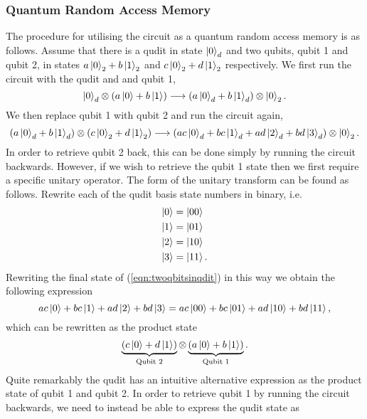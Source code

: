 \subsubsection{Quantum Random Access Memory}
\label{subsubsection:qram}
The procedure for utilising the circuit as a quantum random access memory is as follows.
Assume that there is a qudit in state $\ket{0}_d$ and two qubits, qubit 1 and qubit 2, in states $a\ket{0}_2 + b\ket{1}_2$ and $c\ket{0}_2 + d\ket{1}_2$ respectively.
We first run the circuit with the qudit and and qubit 1,
\begin{equation}
    \ket{0}_d \otimes \left(a\ket{0} + b\ket{1}\right) \longrightarrow \left(a\ket{0}_d + b\ket{1}_d\right) \otimes \ket{0}_2.
\end{equation}
We then replace qubit 1 with qubit 2 and run the circuit again,
\begin{equation}
    \left(a\ket{0}_d + b\ket{1}_d\right) \otimes \left(c\ket{0}_2 + d\ket{1}_2 \right) \longrightarrow \left(ac\ket{0}_d + bc\ket{1}_d + ad\ket{2}_d + bd\ket{3}_d \right)\otimes\ket{0}_2.
    \label{eqn:twoqbitsinqdit}
\end{equation}
In order to retrieve qubit 2 back, this can be done simply by running the circuit backwards.
However, if we wish to retrieve the qubit 1 state then we first require a specific unitary operator. The form of the unitary transform can be found as follows.
Rewrite each of the qudit basis state numbers in binary, i.e.
\begin{align}
    \ket{0} &= \ket{00}\\
    \ket{1} &= \ket{01}\\
    \ket{2} &= \ket{10}\\
    \ket{3} &= \ket{11}.
\end{align}
Rewriting the final state of (\ref{eqn:twoqbitsinqdit}) in this way we obtain the following expression
\begin{equation}
    ac\ket{0} + bc\ket{1} + ad\ket{2} + bd\ket{3} = ac\ket{00} + bc\ket{01} + ad\ket{10} + bd\ket{11},
    \label{eqn:binaryexpression}
\end{equation}
which can be rewritten as the product state
\begin{equation}
    \underbrace{\left(c\ket{0} + d\ket{1}\right)}_{\text{Qubit 2}} \otimes \underbrace{\left(a\ket{0} + b\ket{1}\right)}_{\text{Qubit 1}}.
\end{equation}
Quite remarkably the qudit has an intuitive alternative expression as the product state of qubit 1 and qubit 2. In order to retrieve qubit 1 by running the circuit backwards, we need to instead be able to express the qudit state as
